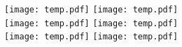 \documentclass[div=17]{scrartcl}
\begin{document}
\vspace{-8\baselineskip}\enlargethispage{9\baselineskip}
\centering
  \texttt{[image: temp.pdf]}%
  \texttt{[image: temp.pdf]}\\
  \texttt{[image: temp.pdf]}%
  \texttt{[image: temp.pdf]}\\
  \texttt{[image: temp.pdf]}%
  \texttt{[image: temp.pdf]}%
\end{document}
